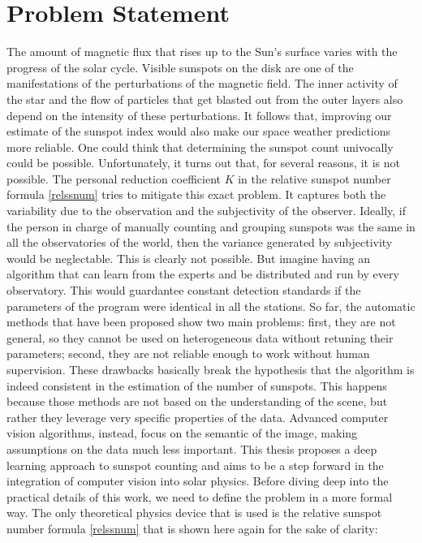\chapter{Problem Statement}
\label{capitolo5}
\thispagestyle{empty}
\noindent The amount of magnetic flux that rises up to the Sun's surface varies with the progress of the solar cycle. Visible sunspots on the disk are one of the manifestations of the perturbations of the magnetic field. The inner activity of the star and the flow of particles that get blasted out from the outer layers also depend on the intensity of these perturbations. It follows that, improving our estimate of the sunspot index would also make our space weather predictions more reliable.
\bigbreak
\noindent One could think that determining the sunspot count univocally could be possible. Unfortunately, it turns out that, for several reasons, it is not possible. The personal reduction coefficient $K$ in the relative sunspot number formula \eqref{relssnum} tries to mitigate this exact problem. It captures both the variability due to the observation and the subjectivity of the observer. Ideally, if the person in charge of manually counting and grouping sunspots was the same in all the observatories of the world, then the variance generated by subjectivity would be neglectable. This is clearly not possible. But imagine having an algorithm that can learn from the experts and be distributed and run by every observatory. This would guardantee constant detection standards if the parameters of the program were identical in all the stations.
\bigbreak
\noindent So far, the automatic methods that have been proposed show two main problems: first, they are not general, so they cannot be used on heterogeneous data without retuning their parameters; second, they are not reliable enough to work without human supervision. These drawbacks basically break the hypothesis that the algorithm is indeed consistent in the estimation of the number of sunspots. This happens because those methods are not based on the understanding of the scene, but rather they leverage very specific properties of the data. Advanced computer vision algorithms, instead, focus on the semantic of the image, making assumptions on the data much less important.
\bigbreak
\noindent This thesis proposes a deep learning approach to sunspot counting and aims to be a step forward in the integration of computer vision into solar physics. Before diving deep into the practical details of this work, we need to define the problem in a more formal way.
\bigbreak
\noindent The only theoretical physics device that is used is the relative sunspot number formula \eqref{relssnum} that is shown here again for the sake of clarity:
